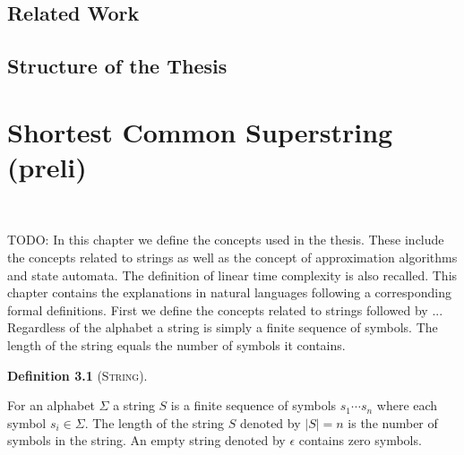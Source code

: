 \documentclass[english,twoside,censored,csm,algorithms-track-2020]{HYthesisML}
\theoremstyle{plain}
\theoremstyle{definition}
\newtheorem{definition}[theorem]{Definition}
\begin{document}
  

  \section{Related Work}



  
  \section{Structure of the Thesis}

\chapter {Shortest Common Superstring (preli)}~\label{chp-preli}








TODO:
In this chapter we define the concepts used in the thesis. These include the concepts related to
strings as well as the concept of approximation algorithms and state automata. The definition of
linear time complexity is also recalled. This chapter contains the explanations in natural
languages following a corresponding formal definitions. First we define the concepts related
to strings followed by ...  \\[1in]



Regardless of the alphabet a string is simply a finite sequence of symbols. The length of the string equals the number of symbols it contains. 

\begin{definition}[\textsc{String}]~\label{def-string}
  
  For an alphabet $\Sigma$ a string $S$ is a finite sequence of symbols  ${s_1\cdots s_n}$ where each symbol $s_i \in \Sigma$.
  The length of the string $S$ denoted by $|S| = n$ is the number of symbols in the string.
  An empty string denoted by $\epsilon$ contains zero symbols.
  
\end{definition}
\end{document}
